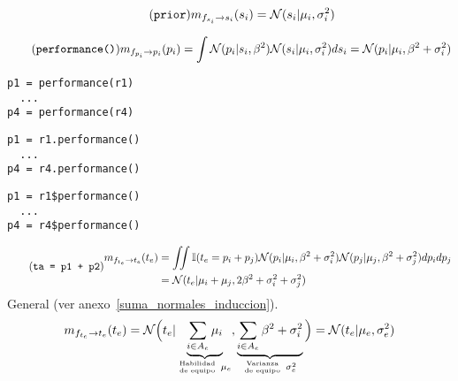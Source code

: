 \documentclass[article]{jss}
\newif\ifen
\newcommand{\en}[1]{\ifen#1\fi}
\newcommand{\N}{\mathcal{N}}
\newcommand\hfrac[2]{\genfrac{}{}{0pt}{}{#1}{#2}} %
\begin{document}
\en{Los mensajes que van de los factores de habilidad $f_{s_i}$ hacia su variable $s_i$ se simplifican, por las reglas del \emph{sum-product algorithm} y la factorización del modelo, al prior.}
%
\begin{equation}\label{eq:m_fs_s} \tag{\texttt{prior}}
 m_{f_{s_i} \rightarrow s_i}(s_i) = \N(s_i| \mu_i, \sigma_i^2)
\end{equation}
%
\en{Luego, el mensaje que la variable $s_i$ le envía al factor rendimiento $f_{p_i}$ también es el prior.}
%
\en{Recordar que los mensajes que las envían las variables no son más que la multiplicación de los mensajes que esa variable recibe del resto de los factores.}
%
\en{Por ser de trivial solución, no haremos explícitos este tipo de mensajes.}
%
\en{Veamos entonces el mensaje que envían los factores rendimiento $f_{p_i}$ a su variable $p_i$.}
%
\begin{equation}\label{eq:m_fp_p} \tag{\texttt{performance()}}
m_{f_{p_i} \rightarrow p_i}(p_i) = \int \N(p_i| s_i, \beta^2) \N(s_i| \mu_i, \sigma_i^2) ds_i = \N(p_i|\mu_i,\beta^2 + \sigma_i^2)
\end{equation}
%
\en{Computacionalmente, podemos calcular esto de la siguiente manera.}
%
\begin{paracol}{3}
\begin{lstlisting}[backgroundcolor=\color{julia}]
p1 = performance(r1)
  ...
p4 = performance(r4)
\end{lstlisting}
  \switchcolumn
\begin{lstlisting}[backgroundcolor=\color{python}]
p1 = r1.performance()
  ...
p4 = r4.performance()
\end{lstlisting}
   \switchcolumn
\begin{lstlisting}[backgroundcolor=\color{r}]
p1 = r1$performance()
  ...
p4 = r4$performance()
\end{lstlisting}  
\end{paracol}
%
\en{Luego, el mensaje que envían }
%
\begin{equation} \label{eq:m_ft_t} \tag{\texttt{ta = p1 + p2}}
\begin{split}
 m_{f_{t_e} \rightarrow t_e}(t_e) &= \iint \mathbb{I}(t_e = p_i + p_j) \N(p_i|\mu_i,\beta^2 + \sigma_i^2)\N(p_j|\mu_j,\beta^2 + \sigma_j^2) dp_idp_j  \\ &=  \N(t_e|\mu_i+\mu_j,2\beta^2 + \sigma_i^2 + \sigma_j^2)
\end{split}
\end{equation}
%
General (ver anexo~\ref{suma_normales_induccion}).
%
\begin{equation*}
 m_{f_{t_e} \rightarrow t_e}(t_e) =  \N \Big( t_e | \underbrace{\sum_{i\in A_e } \mu_i}_{\hfrac{\text{Habilidad}}{\text{de equipo}} \ \mu_e}, \underbrace{\sum_{i \in A_e} \beta^2 + \sigma_i^2}_{\hfrac{\text{Varianza}}{\text{de equipo}} \ \sigma_e^2} \Big) = \N(t_e | \mu_e, \sigma_e^2)
\end{equation*}
\end{document}
